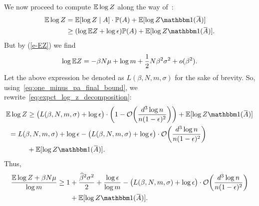 We now proceed to compute $\mathbb{E} \log Z$ along the way
of~\citep{magner2015protein}:
\begin{align}
  \Expct \log Z &= \Expct [\log Z \mid A] \cdot \Prob(A) 
      + \Expct[\log Z \Ind(\bar A)] \\
    &\ge (\log \Expct Z + \log \epsilon) \Prob(A) 
  + \Expct[\log Z \Ind(\bar A)]. \label{eq:expct_log_z_decomposition}
\end{align}
But by (\ref{e-EZ}) we find
\begin{equation}
  \log \mathbb{E} Z = -\beta N \mu + \log m + \frac12 N \beta^2 \sigma^2 + o(\beta^2).
\end{equation}
Let the above expression be denoted as $L(\beta, N, m, \sigma)$ 
for the sake of brevity.
So, using~\eqref{eq:one_minus_pa_final_bound}, 
we rewrite~\eqref{eq:expct_log_z_decomposition}:
\begin{align}
  \Expct \log Z &\ge \bigl( 
        L(\beta, N, m, \sigma) + \log \epsilon
      \bigr) 
      \cdot
      \biggl(
        1 - \mathcal{O}\biggl( \frac{d^3 \log n}{n (1-\epsilon)^2} \biggr)
      \biggr) 
      + \Expct[\log Z \Ind(\bar A)] \\
    &\!\!\!\!\!\!\!\!\!\!\!\!\!\!\!\!= L(\beta, N, m, \sigma) + \log \epsilon
      - \bigl(L(\beta, N, m, \sigma) + \log \epsilon\bigr) 
      \cdot \mathcal{O}\biggl( \frac{d^3 \log n}{n (1-\epsilon)^2} \biggr)
      \\ \notag 
      &+ \Expct[\log Z \Ind(\bar A)].
\end{align}
Thus,
\begin{align}
  \frac{\Expct \log Z + \beta N \mu}{\log m} 
    \ge 1 &+ \frac{\hb^2 \sigma^2}{2} + \frac{\log\epsilon}{\log m}
      - \bigl(L(\beta, N, m, \sigma) + \log \epsilon\bigr) 
      \cdot \mathcal{O}\biggl( \frac{d^3 \log n}{n (1-\epsilon)^2} \biggr)
      \\ \notag 
      & + \Expct[\log Z \Ind(\bar A)].
\end{align}

